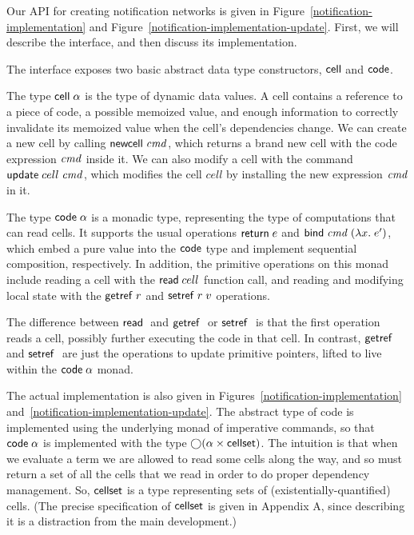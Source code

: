 Our API for creating notification networks is given in
Figure~\ref{notification-implementation} and
Figure~\ref{notification-implementation-update}. First, we will describe
the interface, and then discuss its implementation.

The interface exposes two basic abstract data type constructors, $\mathsf{cell}$
and $\mathsf{code}$.

The type $\mathsf{cell}\;{\alpha}$ is the type of dynamic data values. A
cell contains a reference to a piece of code, a possible memoized
value, and enough information to correctly invalidate its memoized
value when the cell's dependencies change. We can create a new cell by
calling $\mathsf{newcell}\; \mathit{cmd}$, which returns a brand new cell with the code
expression $\mathit{cmd}$ inside it. We can also modify a cell with the
command $\mathsf{update}\;cell\;\mathit{cmd}$, which modifies the cell $cell$ by
installing the new expression $\mathit{cmd}$ in it.

The type $\mathsf{code}\;{\alpha}$ is a monadic type, representing the type of
computations that can read cells. It supports the usual operations
$\mathsf{return}\; e$ and $\mathsf{bind}\; \mathit{cmd}\; (\lambda x.\;e')$, which embed a pure value
into the $\mathsf{code}$ type and implement sequential composition,
respectively. In addition, the primitive operations on this monad
include reading a cell with the $\mathsf{read}\; cell$ function call, and
reading and modifying local state with the $\mathsf{getref}\; r$ and $\mathsf{setref}\;
r\;v$ operations.

The difference between $\mathsf{read}\;$ and $\mathsf{getref}\;$ or $\mathsf{setref}\;$ is that
the first operation reads a cell, possibly further executing the code
in that cell. In contrast, $\mathsf{getref}\;$ and $\mathsf{setref}\;$ are just the
operations to update primitive pointers, lifted to live within the
$\mathsf{code}\;{\alpha}$ monad.
 
The actual implementation is also given in
Figures~\ref{notification-implementation} and~\ref{notification-implementation-update}. 
The abstract type of code is
implemented using the underlying monad of imperative commands, so that
$\mathsf{code}\;{\alpha}$ is implemented with the type $\bigcirc{(\alpha
  \times \mathsf{cellset})}$.  The intuition is that when we evaluate a term
we are allowed to read some cells along the way, and so must return a
set of all the cells that we read in order to do proper dependency
management. So, $\mathsf{cellset}$ is a type representing sets of
(existentially-quantified) cells.  (The precise specification of
$\mathsf{cellset}$ is given in Appendix A, since describing it is a
distraction from the main development.)

